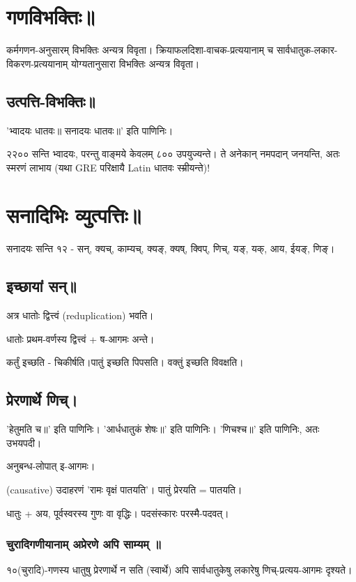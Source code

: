 \documentclass[oneside, article]{memoir}
\begin{document}
\section{गणविभक्तिः॥}
कर्मगणन-अनुसारम् विभक्तिः अन्यत्र विवृता। क्रियाफलदिशा-वाचक-प्रत्ययानाम् च सार्वधातुक-लकार-विकरण-प्रत्ययानाम् योग्यतानुसारा विभक्तिः अन्यत्र विवृता।

\subsection{उत्पत्ति-विभक्तिः॥}
'भ्वादयः धातवः॥ सनादयः धातवः॥' इति पाणिनिः।

२२०० सन्ति भ्वादयः, परन्तु वाङ्मये केवलम् ८०० उपयुज्यन्ते। ते अनेकान् नमपदान् जनयन्ति, अतः स्मरणं लाभाय (यथा GRE परिक्षायै Latin धातवः स्म्रीयन्ते)!

\section{सनादिभिः व्युत्पत्तिः॥}
सनादयः सन्ति १२ - सन्, क्यच्, काम्यच्, क्यङ्, क्यष्, क्विप्, णिच्, यङ्, यक्, आय, ईयङ्, णिङ्।

\subsection{इच्छायां सन्॥}
अत्र धातोः द्वित्त्वं (reduplication) भवति।

धातोः प्रथम-वर्णस्य द्वित्त्वं + ष-आगमः अन्ते।

कर्तुं इच्छति - चिकीर्षति।पातुं इच्छति पिपसति। वक्तुं इच्छति विवक्षति।

\subsection{प्रेरणार्थे णिच्।}
'हेतुमति च॥' इति पाणिनिः। 'आर्धधातुकं शेषः॥' इति पाणिनिः। 'णिचश्च॥' इति पाणिनिः, अतः उभयपदी।

अनुबन्ध-लोपात् इ-आगमः।

(causative) उदाहरणं 'रामः वृक्षं पातयति'। पातुं प्रेरयति = पातयति।

धातुः + अय, पूर्वस्वरस्य गुणः वा वृद्धिः। पदसंस्कारः परस्मै-पदवत्।

\subsubsection{चुरादिगणीयानाम् अप्रेरणे अपि साम्यम् ॥}
१०(चुरादि)-गणस्य धातुषु प्रेरणार्थे न सति (स्वार्थे) अपि सार्वधातुकेषु लकारेषु णिच्-प्रत्यय-आगमः दृश्यते।
\end{document}
